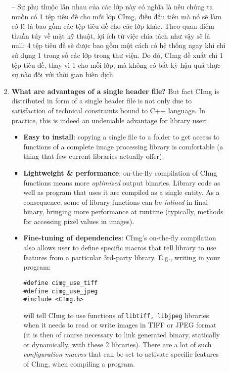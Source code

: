 \documentclass{article}
\begin{document}
\begin{itemize}
\begin{itemize}
\begin{enumerate}
            -- Sự phụ thuộc lẫn nhau của các lớp này có nghĩa là nếu chúng ta muốn có 1 tệp tiêu đề cho mỗi lớp CImg, điều đầu tiên mà nó sẽ làm có lẽ là bao gồm các tệp tiêu đề cho các lớp khác. Theo quan điểm thuần túy về mặt kỹ thuật, lợi ích từ việc chia tách như vậy sẽ là null: 4 tệp tiêu đề sẽ được bao gồm một cách có hệ thống ngay khi chỉ sử dụng 1 trong số các lớp trong thư viện. Do đó, CImg đề xuất chỉ 1 tệp tiêu đề, thay vì 1 cho mỗi lớp, mà không có bất kỳ hậu quả thực sự nào đối với thời gian biên dịch.
            \item {\bf What are advantages of a single header file?} But fact CImg is distributed in form of a single header file is not only due to satisfaction of technical constraints bound to C++ language. In practice, this is indeed an undeniable advantage for library user:
            \begin{itemize}
                \item {\bf Easy to install}: copying a single file to a folder to get access to functions of a complete image processing library is comfortable (a thing that few current libraries actually offer).
                \item {\bf Lightweight \& performance}: on-the-fly compilation of CImg functions means more {\it optimized} output binaries. Library code as well as program that uses it are compiled as a single entity. As a consequence, some of library functions can be {\it inlined} in final binary, bringing more performance at runtime (typically, methods for accessing pixel values in images).
                \item {\bf Fine-tuning of dependencies}: CImg's on-the-fly compilation also allows user to define specific macros that tell library to use features from a particular 3rd-party library. E.g., writing in your program:
                \begin{verbatim}
#define cimg_use_tiff
#define cimg_use_jpeg
#include <CImg.h>
                \end{verbatim}
                will tell CImg to use functions of {\tt  libtiff, libjpeg} libraries when it needs to read or write images in TIFF or JPEG format (it is then of course necessary to link generated binary, statically or dynamically, with these 2 libraries). There are a lot of such {\it configuration macros} that can be set to activate specific features of CImg, when compiling a program.
                

\end{itemize}
\end{enumerate}
\end{itemize}
\end{itemize}
\end{document}
